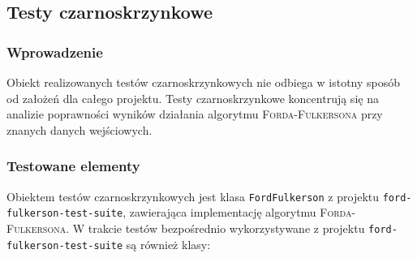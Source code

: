 \subsection{Testy czarno\dywiz skrzynkowe}

\subsubsection{Wprowadzenie}
Obiekt realizowanych testów czarno\dywiz skrzynkowych nie odbiega w istotny sposób od założeń dla całego projektu. Testy czarno\dywiz skrzynkowe koncentrują się na analizie poprawności wyników działania algorytmu \textsc{Forda-Fulkersona} przy znanych danych wejściowych. %

\subsubsection{Testowane elementy}
Obiektem testów czarnoskrzynkowych jest klasa \texttt{FordFulkerson} z projektu \texttt{ford-fulkerson-test-suite}, zawierająca implementację algorytmu \textsc{Forda-Fulkersona}. W trakcie testów bezpośrednio wykorzystywane z projektu \texttt{ford-fulkerson-test-suite} są również klasy:
\begin{itemize}[nosep]


\end{itemize}

